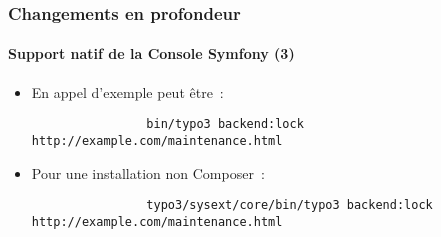 \begin{frame}[fragile]
	\frametitle{Changements en profondeur}
	\framesubtitle{Support natif de la Console Symfony (3)}

	\lstset{basicstyle=\tiny\ttfamily}

	\begin{itemize}

		\item En appel d'exemple peut être~:
			\begin{lstlisting}
				bin/typo3 backend:lock http://example.com/maintenance.html
			\end{lstlisting}

		\item Pour une installation non Composer~:
			\begin{lstlisting}
				typo3/sysext/core/bin/typo3 backend:lock http://example.com/maintenance.html
			\end{lstlisting}

	\end{itemize}

\end{frame}

